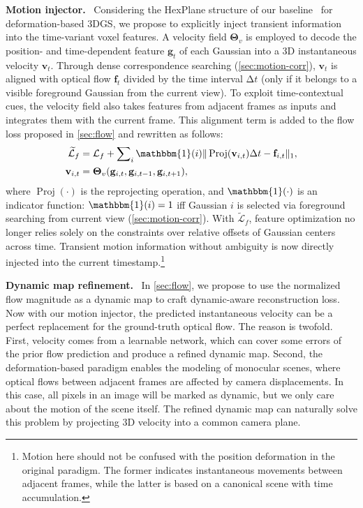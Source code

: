 \documentclass[runningheads]{llncs}
\newcommand{\parsection}[1]{\noindent\textbf{#1.}~}
\begin{document}
\parsection{Motion injector}
%
Considering the HexPlane structure of our baseline~\cite{4dgs} for deformation-based 3DGS, we propose to explicitly inject transient information into the time-variant voxel features. A velocity field $\mathbf{\Theta}_v$ is employed to decode the position- and time-dependent feature $\mathbf{g}_t$ of each Gaussian into a 3D instantaneous velocity $\mathbf{v}_t$. Through dense correspondence searching (\cref{sec:motion-corr}), $\mathbf{v}_t$ is aligned with optical flow $\mathbf{f}_t$ divided by the time interval $\mathrm{\Delta} t$ (only if it belongs to a visible foreground Gaussian from the current view). To exploit time-contextual cues, the velocity field also takes features from adjacent frames as inputs and integrates them with the current frame.
This alignment term is added to the flow loss proposed in \cref{sec:flow} and rewritten as follows:
%
\begin{align}
    \widetilde{\mathcal{L}}_{f} &= \mathcal{L}_{f} + \sum\nolimits_{i} \mathbbm{1}(i) \Vert \operatorname{Proj}(\mathbf{v}_{i,t}) \mathrm{\Delta} t - \mathbf{f}_{i,t} \Vert_1, \\
    \mathbf{v}_{i,t} &= \mathbf{\Theta}_v(\mathbf{g}_{i,t},\mathbf{g}_{i,t-1},\mathbf{g}_{i,t+1}),
\end{align}
%
where $\operatorname{Proj}(\cdot)$ is the reprojecting operation, and $\mathbbm{1}(\cdot)$ is an indicator function: $\mathbbm{1}(i)=1$ iff Gaussian $i$ is selected via foreground searching from current view (\cref{sec:motion-corr}). With $\widetilde{\mathcal{L}}_{f}$, feature optimization no longer relies solely on the constraints over relative offsets of Gaussian centers across time. Transient motion information without ambiguity is now directly injected into the current timestamp.\footnote{Motion here should not be confused with the position deformation in the original paradigm. The former indicates instantaneous movements between adjacent frames, while the latter is based on a canonical scene with time accumulation.}


\parsection{Dynamic map refinement}
%
In \cref{sec:flow}, we propose to use the normalized flow magnitude as a dynamic map to craft dynamic-aware reconstruction loss. Now with our motion injector, the predicted instantaneous velocity can be a perfect replacement for the ground-truth optical flow. The reason is twofold. First, velocity comes from a learnable network, which can cover some errors of the prior flow prediction and produce a refined dynamic map. Second, the deformation-based paradigm enables the modeling of monocular scenes, where optical flows between adjacent frames are affected by camera displacements. In this case, all pixels in an image will be marked as dynamic, but we only care about the motion of the scene itself. The refined dynamic map can naturally solve this problem by projecting 3D velocity into a common camera plane.
\end{document}
